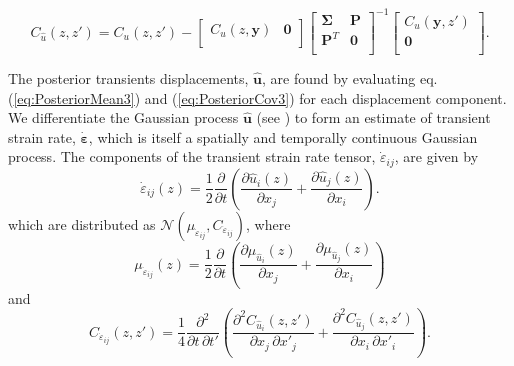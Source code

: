\documentclass[10pt,a4paper]{article}
\begin{document}
\begin{equation}\label{eq:PosteriorCov3}
C_{\hat{u}}(z,z') = C_u(z,z') - 
                    \left[\begin{array}{cc}
                          C_u(z,\bm{y}) & \bm{0} \\
                          \end{array}\right]
                    \left[\begin{array}{cc}
                          \bm{\Sigma} & \bm{P} \\
                          \bm{P}^T  & \bm{0} \\
                          \end{array}\right]^{-1}
                    \left[\begin{array}{c}
                          C_u(\bm{y},z') \\
                          \bm{0} \\
                          \end{array}\right].
\end{equation}

The posterior transients displacements, $\hat{\bm{u}}$, are found by evaluating eq. (\ref{eq:PosteriorMean3}) and (\ref{eq:PosteriorCov3}) for each displacement component. We differentiate the Gaussian process $\hat{\bm{u}}$ (see \cite{Abrahamsen1997}) to form an estimate of transient strain rate, $\dot{\bm{\varepsilon}}$, which is itself a spatially and temporally continuous Gaussian process. The components of the transient strain rate tensor, $\dot{\varepsilon}_{ij}$, are given by
\begin{equation}\label{eq:StrainRate}
\dot{\varepsilon}_{ij}(z) = \frac{1}{2} \frac{\partial}{\partial t} \left(
                                        \frac{\partial \hat{u}_i(z)}{\partial x_j} +  
                                        \frac{\partial \hat{u}_j(z)}{\partial x_i}\right).
\end{equation}
which are distributed as $\mathcal{N}(\mu_{\dot{\varepsilon}_{ij}},C_{\dot{\varepsilon}_{ij}})$, where
\begin{equation}\label{eq:StrainMean}
\mu_{\dot{\varepsilon}_{ij}}(z) = \frac{1}{2}\frac{\partial}{\partial t}\left(
                                  \frac{\partial \mu_{\hat{u}_i}(z)}{\partial x_j} + 
                                  \frac{\partial \mu_{\hat{u}_j}(z)}{\partial x_i} \right)
\end{equation} 
and  
\begin{equation}\label{eq:StrainCov}
C_{\dot{\varepsilon}_{ij}}(z,z') = \frac{1}{4} \frac{\partial^2}{\partial t \, \partial t'}\left(
                                   \frac{\partial^2 C_{\hat{u}_i}(z,z')}{\partial x_j \, \partial x'_j} + 
                                   \frac{\partial^2 C_{\hat{u}_j}(z,z')}{\partial x_i \, \partial x'_i} \right).
\end{equation} 
\end{document}
